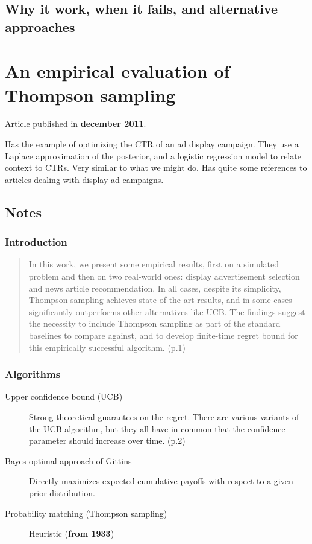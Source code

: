 \documentclass[11pt]{article}
\begin{document}
\subsection{Why it work, when it fails, and alternative approaches}
\label{sec-1-8}


\section{An empirical evaluation of Thompson sampling}
\label{sec-2}
Article published in \textbf{december 2011}.

Has the example of optimizing the CTR of an ad display campaign. They use a
Laplace approximation of the posterior, and a logistic regression model to
relate context to CTRs. Very similar to what we might do. Has quite some
references to articles dealing with display ad campaigns.


\subsection{Notes}
\label{sec-2-1}

\subsubsection{Introduction}
\label{sec-2-1-1}

\begin{quote}
In this work, we present some empirical results, first on a simulated problem
and then on two real-world ones: display advertisement selection and news
article recommendation. In all cases, despite its simplicity, Thompson sampling
achieves state-of-the-art results, and in some cases significantly outperforms
other alternatives like UCB. The findings suggest the necessity to include
Thompson sampling as part of the standard baselines to compare against, and to
develop finite-time regret bound for this empirically successful
algorithm. (p.1)
\end{quote}

\subsubsection{Algorithms}
\label{sec-2-1-2}

\begin{description}
\item[{Upper confidence bound (UCB)}] Strong theoretical guarantees on the
regret. There are various variants of the UCB algorithm, but they all have
in common that the confidence parameter should increase over time. (p.2)
\item[{Bayes-optimal approach of Gittins}] Directly maximizes expected cumulative
payoffs with respect to a given prior distribution.
\item[{Probability matching (Thompson sampling)}] Heuristic (\textbf{from 1933})
\end{description}
\end{document}
